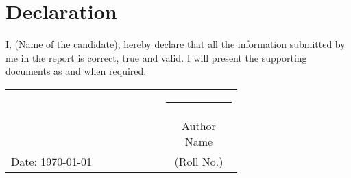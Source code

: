 \chapter*{Declaration}
I, (Name of the candidate), hereby declare that all the information submitted by me in the report is correct, true and valid. I will present the supporting documents as and when required.



\vfill 
\begin{center}	
	\begin{tabular}{p{0.67\linewidth}c}
							& \rule{4cm}{1pt}\\		
							&  Author Name   \\[-1mm]
		Date: \today        &  (Roll No.)    \\			          
	\end{tabular}	
\end{center}


